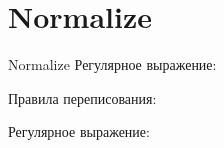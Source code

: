 \section{Normalize}
\begin{frame}{Normalize}
	Регулярное выражение:

	Правила переписования:


	Регулярное выражение:
\end{frame}

